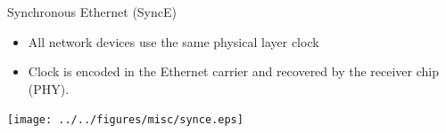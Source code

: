 \documentclass[compress,red]{beamer}
\begin{document}
\begin{frame}{Synchronous Ethernet (SyncE)}
  \begin{center}
  \begin{itemize}
   	\item All network devices use the same physical layer clock
    \item Clock is encoded in the Ethernet carrier and recovered by the receiver chip (PHY).
  \end{itemize}
  \texttt{[image: ../../figures/misc/synce.eps]}
  \end{center}

\end{frame}
\end{document}
